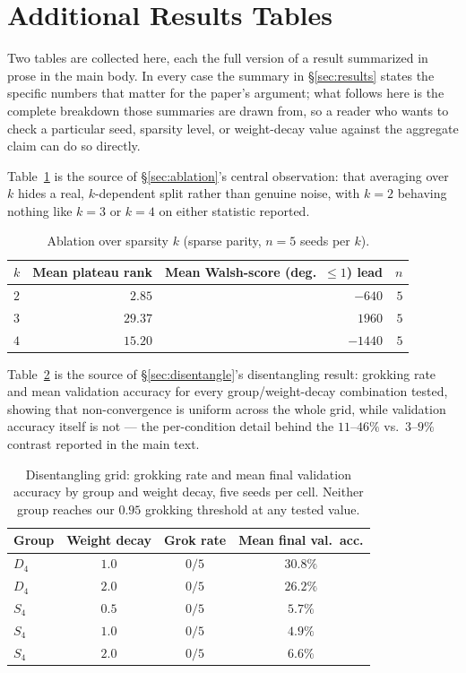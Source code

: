 \documentclass{article}
\begin{document}
\FloatBarrier
\section{Additional Results Tables}
\label{app:extratables}

Two tables are collected here, each the full version of a result
summarized in prose in the main body. In every case the summary in
\S\ref{sec:results} states the specific numbers that matter for the
paper's argument; what follows here is the complete breakdown those
summaries are drawn from, so a reader who wants to check a particular
seed, sparsity level, or weight-decay value against the aggregate claim
can do so directly.

Table~\ref{tab:ksweep} is the source of \S\ref{sec:ablation}'s central
observation: that averaging over $k$ hides a real, $k$-dependent split
rather than genuine noise, with $k=2$ behaving nothing like $k=3$ or
$k=4$ on either statistic reported.

\begin{table}[t]
\caption{Ablation over sparsity $k$ (sparse parity, $n=5$ seeds per $k$).}
\label{tab:ksweep}
\centering
\small
\begin{tabular}{@{}lrrr@{}}
\toprule
$k$ & Mean plateau rank & Mean Walsh-score (deg.\ $\le\!1$) lead & $n$ \\
\midrule
$2$ & $2.85$ & $-640$ & $5$ \\
$3$ & $29.37$ & $1960$ & $5$ \\
$4$ & $15.20$ & $-1440$ & $5$ \\
\bottomrule
\end{tabular}
\end{table}

Table~\ref{tab:grid} is the source of \S\ref{sec:disentangle}'s
disentangling result: grokking rate and mean validation accuracy for
every group/weight-decay combination tested, showing that non-convergence
is uniform across the whole grid, while validation accuracy itself is not
--- the per-condition detail behind the $11$--$46\%$ vs.\ $3$--$9\%$
contrast reported in the main text.

\begin{table}[t]
\caption{Disentangling grid: grokking rate and mean final validation
accuracy by group and weight decay, five seeds per cell. Neither group
reaches our $0.95$ grokking threshold at any tested value.}
\label{tab:grid}
\centering
\small
\begin{tabular}{@{}lccc@{}}
\toprule
Group & Weight decay & Grok rate & Mean final val.\ acc. \\
\midrule
$D_4$ & $1.0$ & $0/5$ & $30.8\%$ \\
$D_4$ & $2.0$ & $0/5$ & $26.2\%$ \\
$S_4$ & $0.5$ & $0/5$ & $5.7\%$ \\
$S_4$ & $1.0$ & $0/5$ & $4.9\%$ \\
$S_4$ & $2.0$ & $0/5$ & $6.6\%$ \\
\bottomrule
\end{tabular}
\end{table}
\end{document}
